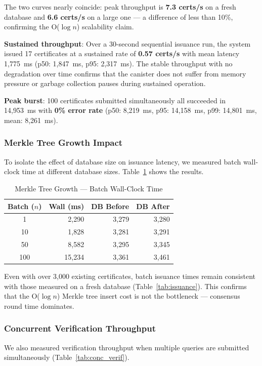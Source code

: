 \documentclass[journal]{IEEEtran}
\begin{document}
The two curves nearly coincide: peak throughput is \textbf{7.3 certs/s} on a fresh database and \textbf{6.6 certs/s} on a large one — a difference of less than 10\%, confirming the O($\log n$) scalability claim.

\textbf{Sustained throughput}: Over a 30-second sequential issuance run, the system issued 17 certificates at a sustained rate of \textbf{0.57 certs/s} with mean latency 1,775~ms (p50: 1,847~ms, p95: 2,317~ms). The stable throughput with no degradation over time confirms that the canister does not suffer from memory pressure or garbage collection pauses during sustained operation.

\textbf{Peak burst}: 100 certificates submitted simultaneously all succeeded in 14,953~ms with \textbf{0\% error rate} (p50: 8,219~ms, p95: 14,158~ms, p99: 14,801~ms, mean: 8,261~ms).

\subsubsection{Merkle Tree Growth Impact}
To isolate the effect of database size on issuance latency, we measured batch wall-clock time at different database sizes. Table~\ref{tab:merkle_growth} shows the results.

\begin{table}[t]
\caption{Merkle Tree Growth --- Batch Wall-Clock Time}
\label{tab:merkle_growth}
\centering\small\renewcommand{\arraystretch}{1.1}
\begin{tabular}{@{}crrr@{}}
\toprule
\textbf{Batch ($n$)} & \textbf{Wall (ms)} & \textbf{DB Before} & \textbf{DB After} \\
\midrule
1   & 2{,}290  & 3{,}279 & 3{,}280 \\
10  & 1{,}828  & 3{,}281 & 3{,}291 \\
50  & 8{,}582  & 3{,}295 & 3{,}345 \\
100 & 15{,}234 & 3{,}361 & 3{,}461 \\
\bottomrule
\end{tabular}
\end{table}

Even with over 3,000 existing certificates, batch issuance times remain consistent with those measured on a fresh database (Table~\ref{tab:issuance}). This confirms that the O($\log n$) Merkle tree insert cost is not the bottleneck — consensus round time dominates.

\subsubsection{Concurrent Verification Throughput}
We also measured verification throughput when multiple queries are submitted simultaneously (Table~\ref{tab:conc_verif}).
\end{document}
